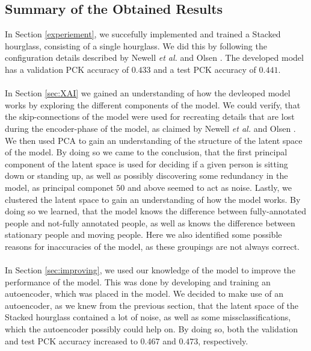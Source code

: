 \documentclass[./main.tex]{subfiles}
\begin{document}
\subsection{Summary of the Obtained Results}\label{subsec:summary}
In Section \ref{experiement}, we succefully implemented and trained a Stacked hourglass, consisting of a single hourglass. We did this by following the configuration details described by Newell \textit{et al.} \cite{Newell} and Olsen \cite{Camilla}. The developed model has a validation PCK accuracy of $0.433$ and a test PCK accuracy of $0.441$. 
\\
\\
In Section \ref{sec:XAI} we gained an understanding of how the devleoped model works by exploring the different components of the model. We could verify, that the skip-connections of the model were used for recreating details that are lost during the encoder-phase of the model, as claimed by Newell \textit{et al.} \cite{Newell} and Olsen \cite{Camilla}. We then used PCA to gain an understanding of the structure of the latent space of the model. By doing so we came to the conclusion, that the first principal component of the latent space is used for deciding if a given person is sitting down or standing up, as well as possibly discovering some redundancy in the model, as principal componet $50$ and above seemed to act as noise. Lastly, we clustered the latent space to gain an understanding of how the model works. By doing so we learned, that the model knows the difference between fully-annotated people and not-fully annotated people, as well as knows the difference between stationary people and moving people. Here we also identified some possible reasons for inaccuracies of the model, as these groupings are not always correct.
\\
\\
In Section \ref{sec:improving}, we used our knowledge of the model to improve the performance of the model. This was done by developing and training an autoencoder, which was placed in the model. We decided to make use of an autoencoder, as we knew from the previous section, that the latent space of the Stacked hourglass contained a lot of noise, as well as some missclassifications, which the autoencoder possibly could help on. By doing so, both the validation and test PCK accuracy increased to $0.467$ and $0.473$, respectively.
\end{document}
